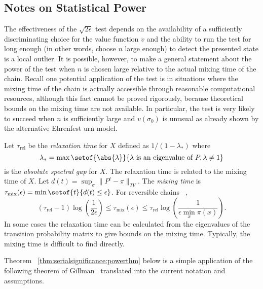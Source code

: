 \documentclass[12pt]{article}
\begin{document}
\subsection*{Notes on Statistical Power}

The effectiveness of the \( \sqrt{2\epsilon} \) test depends on the
availability of a sufficiently discriminating choice for the value
function \( v \) and the ability to run the test for long enough (in
other words, choose \( n \) large enough) to detect the presented state
is a local outlier.  It is possible, however, to make a general
statement about the power of the test when \( n \) is chosen large
relative to the actual mixing time of the chain.  Recall one potential
application of the test is in situations where the mixing time of the
chain is actually accessible through reasonable computational resources,
although this fact cannot be proved rigorously, because theoretical
bounds on the mixing time are not available.  In particular, the test is
very likely to succeed when \( n \) is sufficiently large and \( v(\sigma_0)
\) is unusual as already shown by the alternative Ehrenfest urn model.

\begin{remark}
    Let \( \tau_{\text{rel}} \) be the \emph{relaxation time}%
    for \( X \) defined as \( 1/ (1-\lambda_*) \) where
    \[
        \lambda_* = \max \setof{\abs{\lambda}}{ \lambda \text{ is an
        eigenvalue of } P, \lambda \ne 1 }
    \] is the \emph{absolute spectral gap} for \( X \).  The relaxation
    time is related to the mixing time of \( X \).  Let \( d(t) = \sup_{\sigma}
    \| P^t - \pi \|_{TV} \).  The \emph{mixing time} is \( \tau_{\text{mix}}
    (\epsilon) = \min\setof{t}{d(t) \le \epsilon} \). For reversible
    chains~%
    \cite[Theorems 12.3, 12.4]{levin09},
    \[
        (\tau_{\text{rel}}-1) \log \left( \frac{1}{2\epsilon} \right)
        \le \tau_{\text{mix}}(\epsilon) \le \tau_{\text{rel}} \log \left
        ( \frac{1} {\epsilon \min_x \pi(x)} \right).
    \] In some cases the relaxation time can be calculated from the
    eigenvalues of the transition probability matrix to give bounds on
    the mixing time.  Typically, the mixing time is difficult to find
    directly.
\end{remark}

Theorem~%
\ref{thm:serialsignificance:powerthm} below is a simple application of
the following theorem of Gillman~%
\cite[Theorem 2.1]{gillman98} translated into the current notation and
assumptions.
\end{document}
